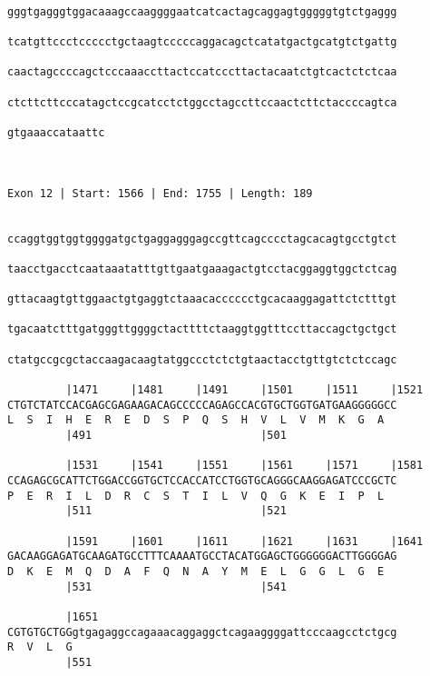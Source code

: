 \documentclass{article}
\begin{document}
\begin{Verbatim}
  
gggtgagggtggacaaagccaaggggaatcatcactagcaggagtgggggtgtctgaggg
                                                            
tcatgttccctccccctgctaagtcccccaggacagctcatatgactgcatgtctgattg
                                                            
caactagccccagctcccaaaccttactccatcccttactacaatctgtcactctctcaa
                                                            
ctcttcttcccatagctccgcatcctctggcctagccttccaactcttctaccccagtca
                                                            
gtgaaaccataattc
               
               
 
Exon 12 | Start: 1566 | End: 1755 | Length: 189


ccaggtggtggtggggatgctgaggagggagccgttcagcccctagcacagtgcctgtct
                                                            
taacctgacctcaataaatatttgttgaatgaaagactgtcctacggaggtggctctcag
                                                            
gttacaagtgttggaactgtgaggtctaaacacccccctgcacaaggagattctctttgt
                                                            
tgacaatctttgatgggttggggctacttttctaaggtggtttccttaccagctgctgct
                                                            
ctatgccgcgctaccaagacaagtatggccctctctgtaactacctgttgtctctccagc
                                                            
         |1471     |1481     |1491     |1501     |1511     |1521
CTGTCTATCCACGAGCGAGAAGACAGCCCCCAGAGCCACGTGCTGGTGATGAAGGGGGCC
L  S  I  H  E  R  E  D  S  P  Q  S  H  V  L  V  M  K  G  A  
         |491                          |501                 
  
         |1531     |1541     |1551     |1561     |1571     |1581
CCAGAGCGCATTCTGGACCGGTGCTCCACCATCCTGGTGCAGGGCAAGGAGATCCCGCTC
P  E  R  I  L  D  R  C  S  T  I  L  V  Q  G  K  E  I  P  L  
         |511                          |521                 
  
         |1591     |1601     |1611     |1621     |1631     |1641
GACAAGGAGATGCAAGATGCCTTTCAAAATGCCTACATGGAGCTGGGGGGACTTGGGGAG
D  K  E  M  Q  D  A  F  Q  N  A  Y  M  E  L  G  G  L  G  E  
         |531                          |541                 
  
         |1651                                              
CGTGTGCTGGgtgagaggccagaaacaggaggctcagaaggggattcccaagcctctgcg
R  V  L  G                                                  
         |551
  

\end{Verbatim}
\end{document}
